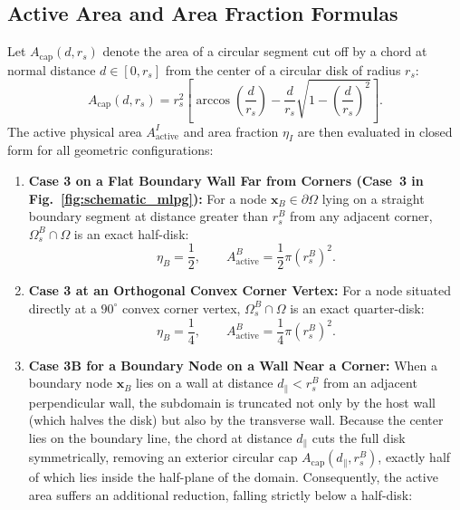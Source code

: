 \documentclass[VANCOUVER,Times1COL]{WileyNJD-v5}
\begin{document}
\subsection{Active Area and Area Fraction Formulas}
Let $A_{\mathrm{cap}}(d, r_s)$ denote the area of a circular segment cut off by a chord at normal distance $d \in [0, r_s]$ from the center of a circular disk of radius $r_s$:
\begin{equation}
    A_{\mathrm{cap}}(d, r_s) = r_s^2 \left[ \arccos\left(\frac{d}{r_s}\right) - \frac{d}{r_s} \sqrt{1 - \left(\frac{d}{r_s}\right)^2} \right].
    \label{eq:cap_area_formula}
\end{equation}
The active physical area $A_{\mathrm{active}}^I$ and area fraction $\eta_I$ are then evaluated in closed form for all geometric configurations:
\begin{enumerate}
    \item \textbf{Case 3 on a Flat Boundary Wall Far from Corners (Case~3 in Fig.~\ref{fig:schematic_mlpg}):} For a node $\mathbf{x}_B \in \partial\Omega$ lying on a straight boundary segment at distance greater than $r_s^B$ from any adjacent corner, $\Omega_s^B \cap \Omega$ is an exact half-disk:
          \begin{equation}
              \eta_B = \frac{1}{2}, \qquad A_{\mathrm{active}}^B = \frac{1}{2} \pi (r_s^B)^2.
              \label{eq:eta_half_disk}
          \end{equation}
    \item \textbf{Case 3 at an Orthogonal Convex Corner Vertex:} For a node situated directly at a $90^\circ$ convex corner vertex, $\Omega_s^B \cap \Omega$ is an exact quarter-disk:
          \begin{equation}
              \eta_B = \frac{1}{4}, \qquad A_{\mathrm{active}}^B = \frac{1}{4} \pi (r_s^B)^2.
              \label{eq:eta_quarter_disk}
          \end{equation}
    \item \textbf{Case 3B for a Boundary Node on a Wall Near a Corner:} When a boundary node $\mathbf{x}_B$ lies on a wall at distance $d_{\parallel} < r_s^B$ from an adjacent perpendicular wall, the subdomain is truncated not only by the host wall (which halves the disk) but also by the transverse wall. Because the center lies on the boundary line, the chord at distance $d_{\parallel}$ cuts the full disk symmetrically, removing an exterior circular cap $A_{\mathrm{cap}}(d_{\parallel}, r_s^B)$, exactly half of which lies inside the half-plane of the domain. Consequently, the active area suffers an additional reduction, falling strictly below a half-disk:

\end{enumerate}
\end{document}
